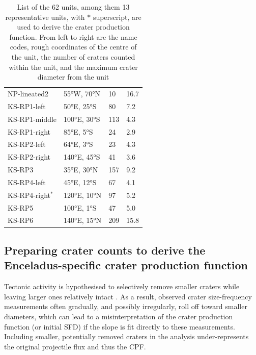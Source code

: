 \documentclass[preprint,11pt,3p,times,authoryear]{elsarticle}
\begin{document}
\begin{table}[ht!]
\begin{tabular}{p{4.0cm} p{3.0cm} p{2.0cm} p{3.0cm} }
  NP-lineated2 & 55°W, 70°N & 10 &  16.7\\
  KS-RP1-left & 50°E, 25°S & 80 &  7.2\\
  KS-RP1-middle & 100°E, 30°S & 113 &  4.3\\
  KS-RP1-right & 85°E, 5°S & 24 &  2.9\\
  KS-RP2-left & 64°E, 3°S & 23 &  4.3\\
  KS-RP2-right & 140°E, 45°S & 41 &  3.6\\
  KS-RP3 & 35°E, 30°N & 157 &  9.2\\
  KS-RP4-left & 45°E, 12°S & 67 & 4.1 \\
  KS-RP4-right$^{*}$ & 120°E, 10°N & 97 & 5.2 \\
  KS-RP5 & 100°E, 1°S & 47 &  5.0 \\
  KS-RP6 & 140°E, 15°N & 209 & 15.8 \\
\hline
\end{tabular}
  \caption{List of the 62 units, among them 13 representative units, with $*$ superscript, are used to derive the crater production function. From left to right are the name codes, rough coordinates of the centre of the unit, the number of craters counted within the unit, and the maximum crater diameter from the unit} 
\label{tab:analytical_units}
\end{table}


\subsection{Preparing crater counts to derive the Enceladus-specific crater production function}
\label{subsec:cpf}
Tectonic activity is hypothesised to selectively remove smaller craters while leaving larger ones relatively intact \citep{Michael2010}. As a result, observed crater size-frequency measurements often gradually, and possibly irregularly, roll off toward smaller diameters, which can lead to a misinterpretation of the crater production function (or initial SFD) if the slope is fit directly to these measurements. Including smaller, potentially removed craters in the analysis under-represents the original projectile flux and thus the CPF.\\
\end{document}
